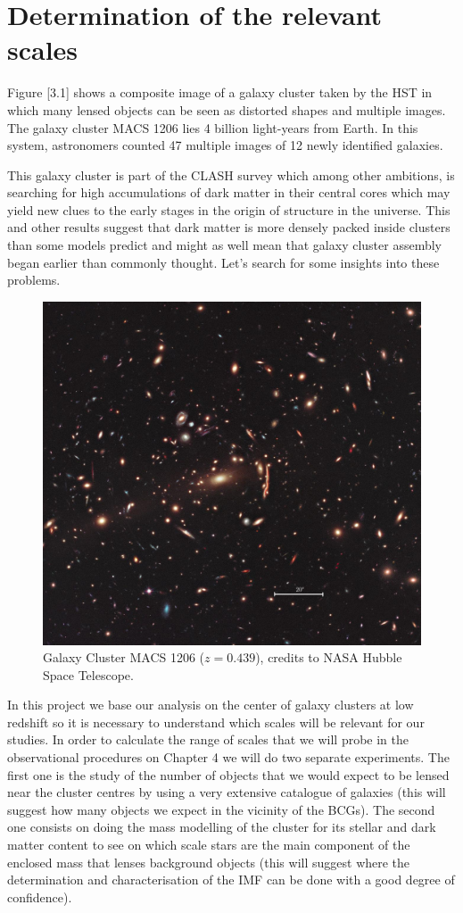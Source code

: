 \chapter{Determination of the relevant scales}

Figure [3.1] shows a composite image of a galaxy cluster taken by the HST in which many lensed objects can be seen as distorted shapes and multiple images. The galaxy cluster MACS 1206 lies 4 billion light-years from Earth. In this system, astronomers counted 47 multiple images of 12 newly identified galaxies. 

This galaxy cluster is part of the CLASH survey which among other ambitions, is searching for high accumulations of dark matter in their central cores which may yield new clues to the early stages in the origin of structure in the universe. This and other results suggest that dark matter is more densely packed inside clusters than some models predict and might as well mean that galaxy cluster assembly began earlier than commonly thought. Let's search for some insights into these problems.

\begin{figure}[H]
\centering
\includegraphics[width=12cm]{images/GC.jpg}
\caption[Galaxy Cluster MACS 1206]{Galaxy Cluster MACS 1206 ($z=0.439$), credits to NASA Hubble Space Telescope.}
\end{figure}

In this project we base our analysis on the center of galaxy clusters at low redshift so it is necessary to understand which scales will be relevant for our studies. In order to calculate the range of scales that we will probe in the observational procedures on Chapter 4 we will do two separate experiments. The first one is the study of the number of objects that we would expect to be lensed near the cluster centres by using a very extensive catalogue of galaxies (this will suggest how many objects we expect in the vicinity of the BCGs). The second one consists on doing the mass modelling of the cluster for its stellar and dark matter content to see on which scale stars are the main component of the enclosed mass that lenses background objects (this will suggest where the determination and characterisation of the IMF can be done with a good degree of confidence).


